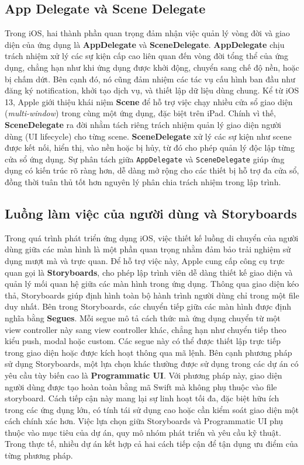          \subsection{App Delegate và Scene Delegate}
         Trong iOS, hai thành phần quan trọng đảm nhận việc quản lý vòng đời và giao diện của ứng dụng là \textbf{AppDelegate} và \textbf{SceneDelegate}. \textbf{AppDelegate} chịu trách nhiệm xử lý các sự kiện cấp cao liên quan đến vòng đời tổng thể của ứng dụng, chẳng hạn như khi ứng dụng được khởi động, chuyển sang chế độ nền, hoặc bị chấm dứt. Bên cạnh đó, nó cũng đảm nhiệm các tác vụ cấu hình ban đầu như đăng ký notification, khởi tạo dịch vụ, và thiết lập dữ liệu dùng chung.
         Kể từ iOS 13, Apple giới thiệu khái niệm \textbf{Scene} để hỗ trợ việc chạy nhiều cửa sổ giao diện (\textit{multi-window}) trong cùng một ứng dụng, đặc biệt trên iPad. Chính vì thế, \textbf{SceneDelegate} ra đời nhằm tách riêng trách nhiệm quản lý giao diện người dùng (UI lifecycle) cho từng scene. \textbf{SceneDelegate} xử lý các sự kiện như scene được kết nối, hiển thị, vào nền hoặc bị hủy, từ đó cho phép quản lý độc lập từng cửa sổ ứng dụng.
         Sự phân tách giữa \texttt{AppDelegate} và \texttt{SceneDelegate} giúp ứng dụng có kiến trúc rõ ràng hơn, dễ dàng mở rộng cho các thiết bị hỗ trợ đa cửa sổ, đồng thời tuân thủ tốt hơn nguyên lý phân chia trách nhiệm trong lập trình.

         \subsection{Luồng làm việc của người dùng và Storyboards}

         Trong quá trình phát triển ứng dụng iOS, việc thiết kế luồng di chuyển của người dùng giữa các màn hình là một phần quan trọng nhằm đảm bảo trải nghiệm sử dụng mượt mà và trực quan. Để hỗ trợ việc này, Apple cung cấp công cụ trực quan gọi là \textbf{Storyboards}, cho phép lập trình viên dễ dàng thiết kế giao diện và quản lý mối quan hệ giữa các màn hình trong ứng dụng. Thông qua giao diện kéo thả, Storyboards giúp định hình toàn bộ hành trình người dùng chỉ trong một file duy nhất.
         Bên trong Storyboards, các chuyển tiếp giữa các màn hình được định nghĩa bằng \textbf{Segues}. Mỗi segue mô tả cách thức mà ứng dụng chuyển từ một view controller này sang view controller khác, chẳng hạn như chuyển tiếp theo kiểu push, modal hoặc custom. Các segue này có thể được thiết lập trực tiếp trong giao diện hoặc được kích hoạt thông qua mã lệnh.
         Bên cạnh phương pháp sử dụng Storyboards, một lựa chọn khác thường được sử dụng trong các dự án có yêu cầu tùy biến cao là \textbf{Programmatic UI}. Với phương pháp này, giao diện người dùng được tạo hoàn toàn bằng mã Swift mà không phụ thuộc vào file storyboard. Cách tiếp cận này mang lại sự linh hoạt tối đa, đặc biệt hữu ích trong các ứng dụng lớn, có tính tái sử dụng cao hoặc cần kiểm soát giao diện một cách chính xác hơn.
         Việc lựa chọn giữa Storyboards và Programmatic UI phụ thuộc vào mục tiêu của dự án, quy mô nhóm phát triển và yêu cầu kỹ thuật. Trong thực tế, nhiều dự án kết hợp cả hai cách tiếp cận để tận dụng ưu điểm của từng phương pháp.